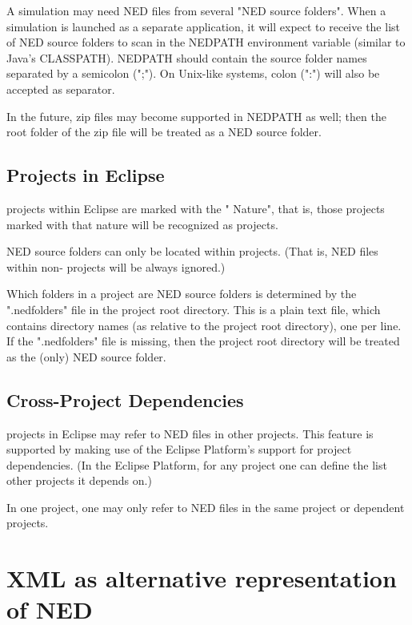 A simulation may need NED files from several "NED source folders".
When a simulation is launched as a separate application, it will expect
to receive the list of NED source folders to scan in the NEDPATH
environment variable (similar to Java's CLASSPATH). NEDPATH should
contain the source folder names separated by a semicolon (";").
On Unix-like systems, colon (":") will also be accepted as separator.

In the future, zip files may become supported in NEDPATH as well;
then the root folder of the zip file will be treated as a NED source
folder.


\subsection{{\opp} Projects in Eclipse}

{\opp} projects within Eclipse are marked with the "{\opp} Nature",
that is, those projects marked with that nature will be recognized as
{\opp} projects.

NED source folders can only be located within {\opp} projects. (That is,
NED files within non-{\opp} projects will be always ignored.)

Which folders in a project are NED source folders is determined by
the ".nedfolders" file in the project root directory. This is a plain
text file, which contains directory names (as relative to the
project root directory), one per line. If the ".nedfolders" file is
missing, then the project root directory will be treated as the (only)
NED source folder.


\subsection{Cross-Project Dependencies}

{\opp} projects in Eclipse may refer to NED files in other projects.
This feature is supported by making use of the Eclipse Platform's
support for project dependencies. (In the Eclipse Platform, for any
project one can define the list other projects it depends on.)

In one project, one may only refer to NED files in the same project
or dependent projects.




\section{XML as alternative representation of NED}

